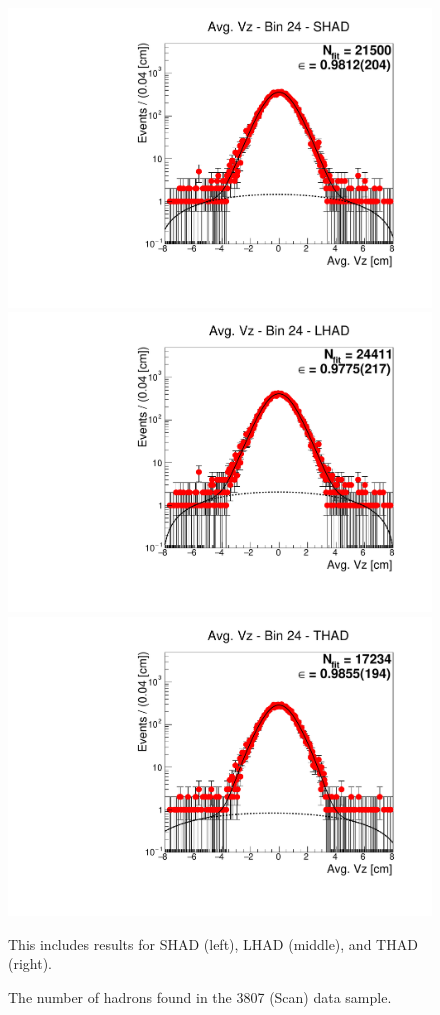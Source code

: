 \begin{figure}[H]
\centering
\includegraphics[scale=0.25]{figures/plots/nonDDbar_fit_results/scan/fit_scan_24_data_SHAD.pdf}
\hspace{-0.5cm}
\includegraphics[scale=0.25]{figures/plots/nonDDbar_fit_results/scan/fit_scan_24_data_LHAD.pdf}
\hspace{-0.5cm}
\includegraphics[scale=0.25]{figures/plots/nonDDbar_fit_results/scan/fit_scan_24_data_THAD.pdf}
\caption{The number of hadrons found in the 3807 (Scan) data sample.}
{This includes results for SHAD (left), LHAD (middle), and THAD (right).}
\label{fig:hadron_fits_scan_24}
\end{figure}

